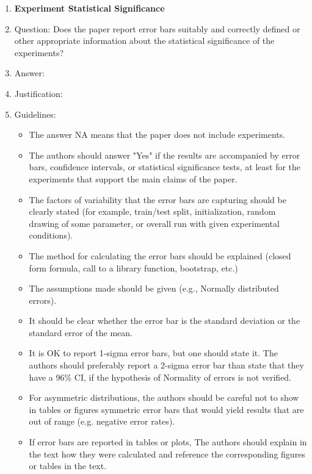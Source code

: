 \documentclass{article}
\begin{document}
\begin{enumerate}
\item {\bf Experiment Statistical Significance}
    \item[] Question: Does the paper report error bars suitably and correctly defined or other appropriate information about the statistical significance of the experiments?
    \item[] Answer: \answerTODO{} %
    \item[] Justification: \justificationTODO{}
    \item[] Guidelines:
    \begin{itemize}
        \item The answer NA means that the paper does not include experiments.
        \item The authors should answer "Yes" if the results are accompanied by error bars, confidence intervals, or statistical significance tests, at least for the experiments that support the main claims of the paper.
        \item The factors of variability that the error bars are capturing should be clearly stated (for example, train/test split, initialization, random drawing of some parameter, or overall run with given experimental conditions).
        \item The method for calculating the error bars should be explained (closed form formula, call to a library function, bootstrap, etc.)
        \item The assumptions made should be given (e.g., Normally distributed errors).
        \item It should be clear whether the error bar is the standard deviation or the standard error of the mean.
        \item It is OK to report 1-sigma error bars, but one should state it. The authors should preferably report a 2-sigma error bar than state that they have a 96\% CI, if the hypothesis of Normality of errors is not verified.
        \item For asymmetric distributions, the authors should be careful not to show in tables or figures symmetric error bars that would yield results that are out of range (e.g. negative error rates).
        \item If error bars are reported in tables or plots, The authors should explain in the text how they were calculated and reference the corresponding figures or tables in the text.
    \end{itemize}


\end{enumerate}
\end{document}
